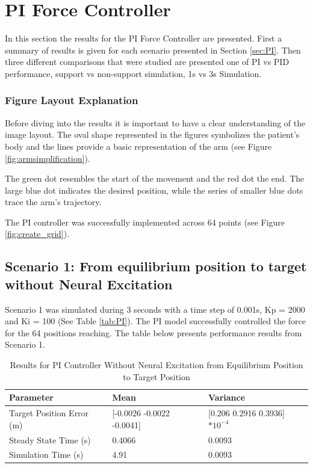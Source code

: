 \section{PI Force Controller}
In this section the results for the PI Force Controller are presented. First a summary of results is given for each scenario presented in Section \ref{sec:PI}. Then three different comparisons that were studied are presented one of PI vs PID performance, support vs non-support simulation, 1s vs 3s Simulation. 

\subsubsection{Figure Layout Explanation}
Before diving into the results it is important to have a clear understanding of the image layout. The oval shape represented in the figures symbolizes the patient's body and the lines provide a basic representation of the arm (see Figure \ref{fig:armsimplification}). 

The green dot resembles the start of the movement and the red dot the end. The large blue dot indicates the desired position, while the series of smaller blue dots trace the arm's trajectory. 

The PI controller was successfully implemented across 64 points (see Figure \ref{fig:create_grid}).

\subsection{Scenario 1: From equilibrium position to target without Neural Excitation}
Scenario 1 was simulated during 3 seconds with a time step of 0.001s, Kp = 2000 and Ki = 100 (See Table \ref{tab:PI}).
The PI model successfully controlled the force for the 64 positions reaching. The table below presents performance results from Scenario 1.

\begin{table}[h]
    \centering
    \caption{Results for PI Controller Without Neural Excitation from Equilibrium Position to Target Position}
    \scriptsize
    \begin{tabularx}{\textwidth}{|l|X|X|}
        \hline
        \textbf{Parameter} & \textbf{Mean} & \textbf{Variance} \\        
        \hline

        Target Position Error (m) & [-0.0026 -0.0022 -0.0041] & [0.206 0.2916 0.3936]$*10^{-4}$ \\
        Steady State Time (s) & 0.4066 & 0.0093 \\
        Simulation Time (s) & 4.91 & 0.0093        \\
        \hline

    \end{tabularx}

    \label{tab:PINNE}
\end{table}

